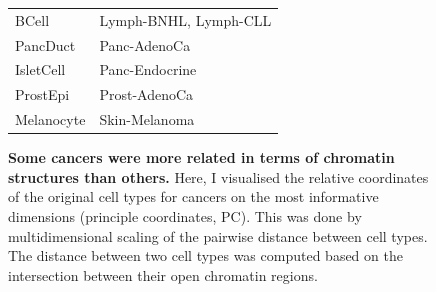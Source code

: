 \begin{figure}[h!]
\begin{minipage}[c]{\textwidth}
\begin{tabulary}{\textwidth}{ ll }
    BCell & Lymph-BNHL, Lymph-CLL \\
    
    PancDuct & Panc-AdenoCa \\
    
    IsletCell & Panc-Endocrine \\
    
    ProstEpi & Prost-AdenoCa \\
    
    Melanocyte & Skin-Melanoma \\
    \bottomrule
    
    \end{tabulary}
    
  \end{minipage}\hfill
  \vspace{0.5cm}
  
  \begin{minipage}[c]{\textwidth}
    \caption{
      \textbf{Some cancers were more related in terms of chromatin structures than others.} Here, I visualised the relative coordinates of the original cell types for cancers on the most informative dimensions (principle coordinates, PC). This was done by multidimensional scaling of the pairwise distance between cell types. The distance between two cell types was computed based on the intersection between their open chromatin regions. 
    } \label{fig:encode_pca}
  \end{minipage}
\end{figure}
